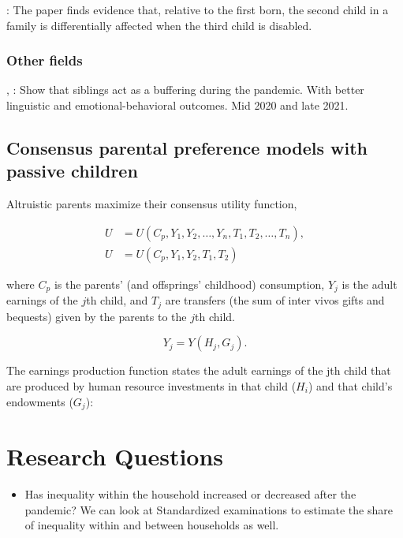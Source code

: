\documentclass[11pt,a4paper,twoside]{article}
\begin{document}
\cite{black_sibling_2021}: The paper finds evidence that, relative to the first born, the second child in a family is differentially affected when the third child is disabled.


\subsubsection{Other fields}

\cite{hughes_siblings_2023}, \cite{lampis_long-lasting_2023}: Show that siblings act as a buffering during the pandemic. With better linguistic and emotional-behavioral outcomes. Mid 2020 and late 2021. 

\cite{}



\subsection{Consensus parental preference models with passive children}

Altruistic parents maximize their consensus utility function,

\begin{equation}
\begin{aligned}
U &= U(C_p, Y_1, Y_2, \ldots, Y_n, T_1, T_2, \ldots, T_n), \\
U &= U(C_p, Y_1, Y_2, T_1, T_2)
\end{aligned}
\tag{1}
\end{equation}

where $C_p$ is the parents' (and offsprings' childhood) consumption, $Y_j$ is the adult earnings of the $j$th child, and $T_j$ are transfers (the sum of inter vivos gifts and bequests) given by the parents to the $j$th child. 

\begin{equation}
Y_j = Y(H_j, G_j).
\tag{2}
\end{equation}

The earnings production function states the adult earnings of the jth child that are produced by human resource investments in that child ($H_i$) and that child's endowments ($G_j$):

\section{Research Questions}

\begin{itemize}
    \item Has inequality within the household increased or decreased after the pandemic? We can look at Standardized examinations to estimate the share of inequality within and between households as well. \cite{giannola_parental_2024}
\end{itemize}






\end{document}

